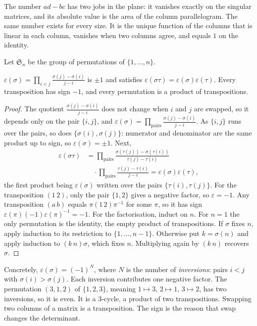 The number $ad-bc$ has two jobs in the plane: it vanishes exactly on the singular matrices, and its absolute value is the area of the column parallelogram. The same number exists for every size. It is the unique function of the columns that is linear in each column, vanishes when two columns agree, and equals $1$ on the identity.

Let $\mathfrak S_n$ be the group of permutations of $\{1,\dots,n\}$.

\begin{lemma}\label{lem:sign}
$\varepsilon(\sigma)=\prod_{i<j}\frac{\sigma(j)-\sigma(i)}{j-i}$ is $\pm1$ and satisfies $\varepsilon(\sigma\tau)=\varepsilon(\sigma)\varepsilon(\tau)$. Every transposition has sign $-1$, and every permutation is a product of transpositions.
\end{lemma}
\begin{proof}
The quotient $\frac{\sigma(j)-\sigma(i)}{j-i}$ does not change when $i$ and $j$ are swapped, so it depends only on the pair $\{i,j\}$, and $\varepsilon(\sigma)=\prod_{\text{pairs}}\frac{\sigma(j)-\sigma(i)}{j-i}$. As $\{i,j\}$ runs over the pairs, so does $\{\sigma(i),\sigma(j)\}$: numerator and denominator are the same product up to sign, so $\varepsilon(\sigma)=\pm1$. Next,
\[
\begin{aligned}\varepsilon(\sigma\tau)&=\prod_{\text{pairs}}\frac{\sigma(\tau(j))-\sigma(\tau(i))}{\tau(j)-\tau(i)}\\&\quad\cdot\prod_{\text{pairs}}\frac{\tau(j)-\tau(i)}{j-i}=\varepsilon(\sigma)\varepsilon(\tau),\end{aligned}
\]
the first product being $\varepsilon(\sigma)$ written over the pairs $\{\tau(i),\tau(j)\}$. For the transposition $(1\,2)$, only the pair $\{1,2\}$ gives a negative factor, so $\varepsilon=-1$. Any transposition $(a\,b)$ equals $\pi(1\,2)\pi^{-1}$ for some $\pi$, so it has sign $\varepsilon(\pi)(-1)\varepsilon(\pi)^{-1}=-1$. For the factorisation, induct on $n$. For $n=1$ the only permutation is the identity, the empty product of transpositions. If $\sigma$ fixes $n$, apply induction to its restriction to $\{1,\dots,n-1\}$. Otherwise put $k=\sigma(n)$ and apply induction to $(k\,n)\sigma$, which fixes $n$. Multiplying again by $(k\,n)$ recovers $\sigma$.
\end{proof}

Concretely, $\varepsilon(\sigma)=(-1)^N$, where $N$ is the number of \emph{inversions}: pairs $i<j$ with $\sigma(i)>\sigma(j)$. Each inversion contributes one negative factor. The permutation $(3,1,2)$ of $\{1,2,3\}$, meaning $1\mapsto3$, $2\mapsto1$, $3\mapsto2$, has two inversions, so it is even. It is a $3$-cycle, a product of two transpositions. Swapping two columns of a matrix is a transposition. The sign is the reason that swap changes the determinant.

